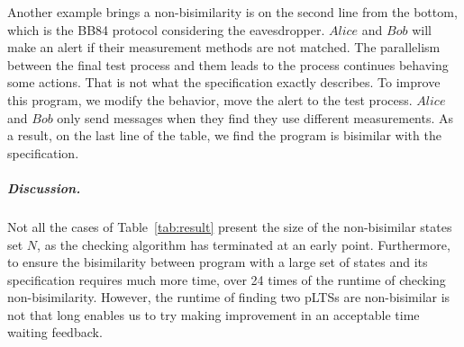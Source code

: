 \documentclass[a4paper,UKenglish,cleveref, autoref]{lipics-v2019}
\begin{document}
Another example brings a non-bisimilarity is on the second line from the bottom, which is the BB84 protocol considering the eavesdropper. $Alice$ and $Bob$ will make an alert if their measurement methods are not matched. The parallelism between the final test process and them leads to the process continues behaving some actions. That is not what the specification exactly describes. To improve this program, we modify the behavior, move the alert to the test process. $Alice$ and $Bob$ only send messages when they find they use different measurements. As a result, on the last line of the table, we find the program is bisimilar with the specification.
\subparagraph*{Discussion.} Not all the cases of Table~\ref{tab:result} present the size of the non-bisimilar states set $N$, as the checking algorithm has terminated at an early point. Furthermore, to ensure the bisimilarity between program with a large set of states and its specification requires much more time, over 24 times of the runtime of checking non-bisimilarity. However, the runtime of finding two pLTSs are non-bisimilar is not that long enables us to try making improvement in an acceptable time waiting feedback.
\end{document}

